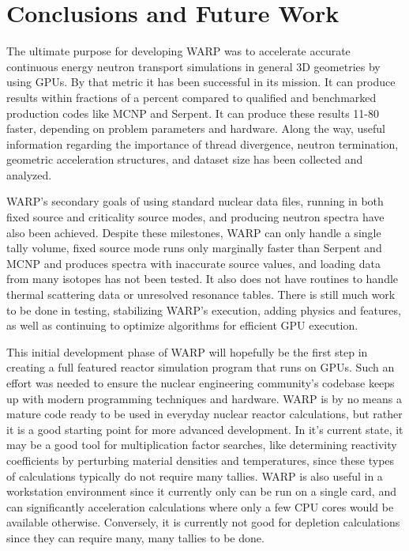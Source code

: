 \chapter{Conclusions and Future Work}
\label{chap:conclusions}

The ultimate purpose for developing WARP was to accelerate accurate continuous energy neutron transport simulations in general 3D geometries by using GPUs.  By that metric it has been successful in its mission.  It can produce results within fractions of a percent compared to qualified and benchmarked production codes like MCNP and Serpent.  It can produce these results 11-80 faster, depending on problem parameters and hardware.  Along the way, useful information regarding the importance of thread divergence, neutron termination, geometric acceleration structures, and dataset size has been collected and analyzed.

WARP's secondary goals of using standard nuclear data files, running in both fixed source and criticality source modes, and producing neutron spectra have also been achieved.  Despite these milestones, WARP can only handle a single tally volume, fixed source mode runs only marginally faster than Serpent and MCNP and produces spectra with inaccurate source values, and loading data from many isotopes has not been tested.  It also does not have routines to handle thermal scattering data or unresolved resonance tables. There is still much work to be done in testing, stabilizing WARP's execution, adding physics and features, as well as continuing to optimize algorithms for efficient GPU execution.

This initial development phase of WARP will hopefully be the first step in creating a full featured reactor simulation program that runs on GPUs.  Such an effort was needed to ensure the nuclear engineering community's codebase keeps up with modern programming techniques and hardware.  WARP is by no means a mature code ready to be used in everyday nuclear reactor calculations, but rather it is a good starting point for more advanced development.  In it's current state, it may be a good tool for multiplication factor searches, like determining reactivity coefficients by perturbing material densities and temperatures, since these types of calculations typically do not require many tallies.  WARP is also useful in a workstation environment since it currently only can be run on a single card, and can significantly acceleration calculations where only a few CPU cores would be available otherwise.  Conversely, it is currently not good for depletion calculations since they can require many, many tallies to be done.  

